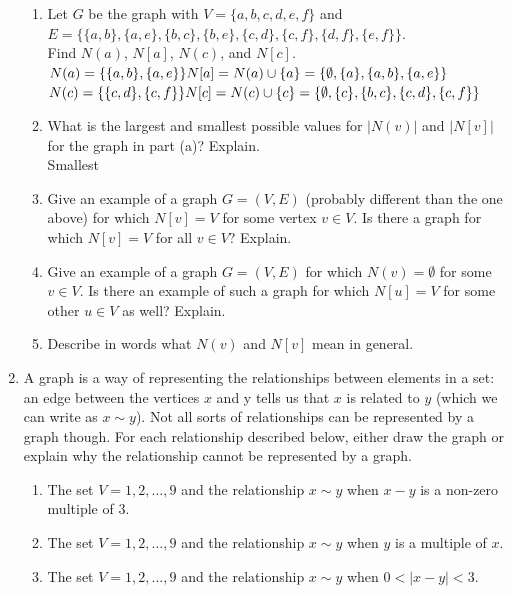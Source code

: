\documentclass[11pt,a4paper]{article}
\begin{document}
\begin{enumerate}
\begin{enumerate}
        \item Let $G$ be the graph with $V = \{a,b,c,d,e,f\}$ and\\ $E = \{\{a,b\},\{a,e\},\{b,c\},\{b,e\},\{c,d\},\{c,f\},\{d,f\},\{e,f\}\}$. \\Find $N(a)$, $N[a]$, $N(c)$, and $N[c]$.\\
            $N(a) = \{ \{a,b\}, \{a,e\}\}\\ N[a] = N(a)\cup \{a\}\\ = \{\emptyset,\{a\},\{a,b\},\{a,e\}\}$\\
            $N(c) = \{\{c,d\},\{c,f\}\}\\N[c] = N(c)\cup\{c\}\\ = \{\emptyset,\{c\}, \{b,c\},\{c,d\},\{c,f\}\}$
        \item What is the largest and smallest possible values for $|N(v)|$ and $|N[v]|$ for the graph in part (a)? Explain.\\
Smallest
        \item Give an example of a graph $G=(V,E)$ (probably different than the one above) for which $N[v]=V$ for some vertex $v\in V$. Is there a graph for which $N[v]=V$ for all $v\in V$? Explain.
        \item Give an example of a graph $G=(V,E)$ for which $N(v)=\emptyset$ for some $v\in V$. Is there an example of such a graph for which $N[u]=V$ for some other $u\in V$ as well? Explain.
        \item Describe in words what $N(v)$ and $N[v]$ mean in general.

        \end{enumerate}

        \item A graph is a way of representing the relationships between elements in a set: an edge between the vertices $x$ and y tells us that $x$ is related to $y$ (which we can write as $x\sim y$). Not all sorts of relationships can be represented by a graph though. For each relationship described below, either draw the graph or explain why the relationship cannot be represented by a graph.

            \begin{enumerate}
                \item The set $V={1,2,…,9}$ and the relationship $x\sim y$ when $x-y$ is a non-zero multiple of 3.
                \item The set $V={1,2,…,9}$ and the relationship $x\sim y$ when $y$ is a multiple of $x$.
                \item The set $V={1,2,…,9}$ and the relationship $x\sim y$ when $0<|x−y|<3$.

            \end{enumerate}
        \end{enumerate}
	
\end{document}
